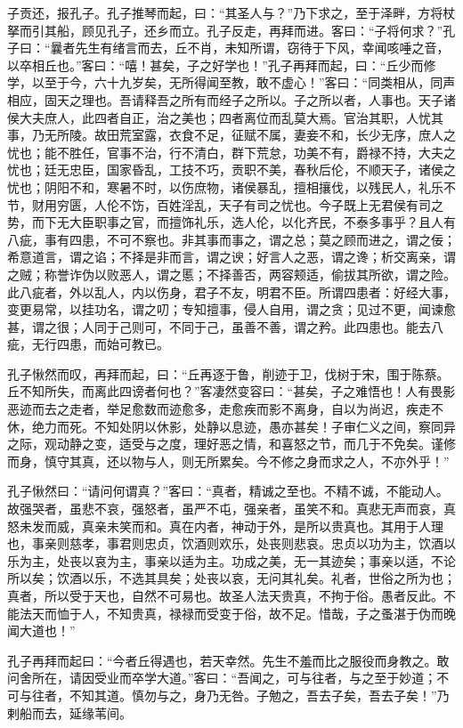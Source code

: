 \documentclass[]{article}
\begin{document}
子贡还，报孔子。孔子推琴而起，曰：``其圣人与？''乃下求之，至于泽畔，方将杖拏而引其船，顾见孔子，还乡而立。孔子反走，再拜而进。客曰：``子将何求？''孔子曰：``曩者先生有绪言而去，丘不肖，未知所谓，窃待于下风，幸闻咳唾之音，以卒相丘也。''客曰：``嘻！甚矣，子之好学也！''孔子再拜而起，曰：``丘少而修学，以至于今，六十九岁矣，无所得闻至教，敢不虚心！''客曰：``同类相从，同声相应，固天之理也。吾请释吾之所有而经子之所以。子之所以者，人事也。天子诸侯大夫庶人，此四者自正，治之美也；四者离位而乱莫大焉。官治其职，人忧其事，乃无所陵。故田荒室露，衣食不足，征赋不属，妻妾不和，长少无序，庶人之忧也；能不胜任，官事不治，行不清白，群下荒怠，功美不有，爵禄不持，大夫之忧也；廷无忠臣，国家昏乱，工技不巧，贡职不美，春秋后伦，不顺天子，诸侯之忧也；阴阳不和，寒暑不时，以伤庶物，诸侯暴乱，擅相攘伐，以残民人，礼乐不节，财用穷匮，人伦不饬，百姓淫乱，天子有司之忧也。今子既上无君侯有司之势，而下无大臣职事之官，而擅饰礼乐，选人伦，以化齐民，不泰多事乎？且人有八疵，事有四患，不可不察也。非其事而事之，谓之总；莫之顾而进之，谓之佞；希意道言，谓之谄；不择是非而言，谓之谀；好言人之恶，谓之谗；析交离亲，谓之贼；称誉诈伪以败恶人，谓之慝；不择善否，两容颊适，偷拔其所欲，谓之险。此八疵者，外以乱人，内以伤身，君子不友，明君不臣。所谓四患者：好经大事，变更易常，以挂功名，谓之叨；专知擅事，侵人自用，谓之贪；见过不更，闻谏愈甚，谓之很；人同于己则可，不同于己，虽善不善，谓之矜。此四患也。能去八疵，无行四患，而始可教已。

孔子愀然而叹，再拜而起，曰：``丘再逐于鲁，削迹于卫，伐树于宋，围于陈蔡。丘不知所失，而离此四谤者何也？''客凄然变容曰：``甚矣，子之难悟也！人有畏影恶迹而去之走者，举足愈数而迹愈多，走愈疾而影不离身，自以为尚迟，疾走不休，绝力而死。不知处阴以休影，处静以息迹，愚亦甚矣！子审仁义之间，察同异之际，观动静之变，适受与之度，理好恶之情，和喜怒之节，而几于不免矣。谨修而身，慎守其真，还以物与人，则无所累矣。今不修之身而求之人，不亦外乎！''

孔子愀然曰：``请问何谓真？''客曰：``真者，精诚之至也。不精不诚，不能动人。故强哭者，虽悲不哀，强怒者，虽严不屯，强亲者，虽笑不和。真悲无声而哀，真怒未发而威，真亲未笑而和。真在内者，神动于外，是所以贵真也。其用于人理也，事亲则慈孝，事君则忠贞，饮酒则欢乐，处丧则悲哀。忠贞以功为主，饮酒以乐为主，处丧以哀为主，事亲以适为主。功成之美，无一其迹矣；事亲以适，不论所以矣；饮酒以乐，不选其具矣；处丧以哀，无问其礼矣。礼者，世俗之所为也；真者，所以受于天也，自然不可易也。故圣人法天贵真，不拘于俗。愚者反此。不能法天而恤于人，不知贵真，禄禄而受变于俗，故不足。惜哉，子之蚤湛于伪而晚闻大道也！''

孔子再拜而起曰：``今者丘得遇也，若天幸然。先生不羞而比之服役而身教之。敢问舍所在，请因受业而卒学大道。''客曰：``吾闻之，可与往者，与之至于妙道；不可与往者，不知其道。慎勿与之，身乃无咎。子勉之，吾去子矣，吾去子矣！''乃剌船而去，延缘苇间。
\end{document}
